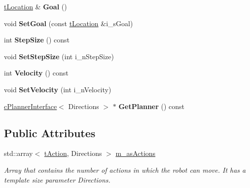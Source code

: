 \begin{DoxyCompactItemize}
\mbox{\hyperlink{structplanner_1_1t_location}{t\+Location}} \& {\bfseries Goal} ()
\item 
\mbox{\label{classplanner_1_1c_rover_interface_a8f0e30cf351e8cb7ba75622273056343}} 
void {\bfseries Set\+Goal} (const \mbox{\hyperlink{structplanner_1_1t_location}{t\+Location}} \&i\+\_\+s\+Goal)
\item 
\mbox{\label{classplanner_1_1c_rover_interface_a2a10c0d42c89adefa46390fe351583a2}} 
int {\bfseries Step\+Size} () const
\item 
\mbox{\label{classplanner_1_1c_rover_interface_ac6410b636f0f2d5614e3463912f9646f}} 
void {\bfseries Set\+Step\+Size} (int i\+\_\+n\+Step\+Size)
\item 
\mbox{\label{classplanner_1_1c_rover_interface_a65279be04ab88f54d69204087503448b}} 
int {\bfseries Velocity} () const
\item 
\mbox{\label{classplanner_1_1c_rover_interface_a209a069d48223e427e27e4582037b158}} 
void {\bfseries Set\+Velocity} (int i\+\_\+n\+Velocity)
\item 
\mbox{\label{classplanner_1_1c_rover_interface_a5a4d39a81f9fac046411fa2f70986b96}} 
\mbox{\hyperlink{classplanner_1_1c_planner_interface}{c\+Planner\+Interface}}$<$ Directions $>$ $\ast$ {\bfseries Get\+Planner} () const
\end{DoxyCompactItemize}
\subsection*{Public Attributes}
\begin{DoxyCompactItemize}
\item 
\mbox{\label{classplanner_1_1c_rover_interface_a119c31cfd1e6aa72921fc5185e6f44a5}} 
std\+::array$<$ \mbox{\hyperlink{structplanner_1_1t_action}{t\+Action}}, Directions $>$ \mbox{\hyperlink{classplanner_1_1c_rover_interface_a119c31cfd1e6aa72921fc5185e6f44a5}{m\+\_\+as\+Actions}}
\begin{DoxyCompactList}\small\item\em Array that contains the number of actions in which the robot can move. It has a template size parameter Directions. \end{DoxyCompactList}\end{DoxyCompactItemize}

